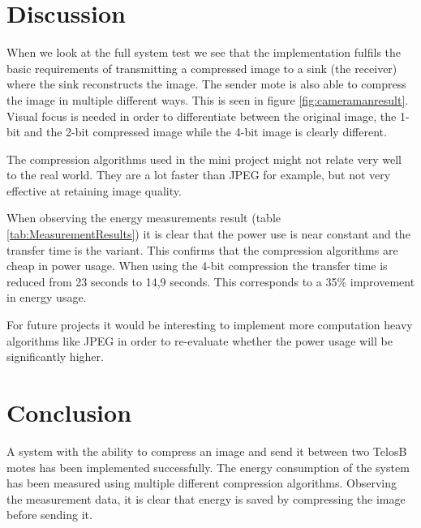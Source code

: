 \section{Discussion}
When we look at the full system test we see that the implementation fulfils the basic requirements of transmitting a compressed image to a sink (the receiver) where the sink reconstructs the image. The sender mote is also able to compress the image in multiple different ways. This is seen in figure \ref{fig:cameramanresult}. Visual focus is needed in order to differentiate between the original image, the 1-bit and the 2-bit compressed image while the 4-bit image is clearly different.

The compression algorithms used in the mini project might not relate very well to the real world. They are a lot faster than  JPEG for example, but not very effective at retaining image quality.

When observing the energy measurements result (table \ref{tab:MeasurementResults}) it is clear that the power use is near constant and the transfer time is the variant. This confirms that the compression algorithms are cheap in power usage. When using the 4-bit compression the transfer time is reduced from 23 seconds to 14,9 seconds. This corresponds to a 35\% improvement in energy usage.

For future projects it would be interesting to implement more computation heavy algorithms like JPEG in order to re-evaluate whether the power usage will be significantly higher.

\section{Conclusion}
A system with the ability to compress an image and send it between two TelosB motes has been implemented successfully. The energy consumption of the system has been measured using multiple different compression algorithms. Observing the measurement data, it is clear that energy is saved by compressing the image before sending it. 